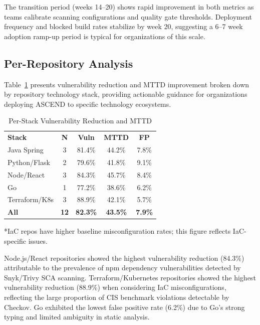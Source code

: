 \documentclass[journal]{IEEEtran}
\begin{document}
The transition period (weeks 14--20) shows rapid improvement in both metrics as teams calibrate scanning configurations and quality gate thresholds. Deployment frequency and blocked build rates stabilize by week 20, suggesting a 6--7 week adoption ramp-up period is typical for organizations of this scale.

\subsection{Per-Repository Analysis}

Table~\ref{tab:perrepo} presents vulnerability reduction and MTTD improvement broken down by repository technology stack, providing actionable guidance for organizations deploying ASCEND to specific technology ecosystems.

\begin{table}[h]
\centering
\caption{Per-Stack Vulnerability Reduction and MTTD}
\label{tab:perrepo}
\scriptsize
\begin{tabular}{@{}lcccc@{}}
\rowcolor{TableHeader}\color{white}\textbf{Stack} & \color{white}\textbf{N} & \color{white}\textbf{Vuln} & \color{white}\textbf{MTTD} & \color{white}\textbf{FP} \\
\rowcolor{TableAlt}Java Spring & 3 & 81.4\% & 44.2\% & 7.8\% \\
\rowcolor{white}Python/Flask & 2 & 79.6\% & 41.8\% & 9.1\% \\
\rowcolor{TableAlt}Node/React & 3 & 84.3\% & 45.7\% & 8.4\% \\
\rowcolor{white}Go & 1 & 77.2\% & 38.6\% & 6.2\% \\
\rowcolor{TableAlt}Terraform/K8s & 3 & 88.9\% & 42.1\% & 5.7\% \\
\rowcolor{IEEENavy!20}\textbf{All} & \textbf{12} & \textbf{82.3\%} & \textbf{43.5\%} & \textbf{7.9\%} \\
\end{tabular}
\end{table}
\footnotesize{*IaC repos have higher baseline misconfiguration rates; this figure reflects IaC-specific issues.}

Node.js/React repositories showed the highest vulnerability reduction (84.3\%) attributable to the prevalence of npm dependency vulnerabilities detected by Snyk/Trivy SCA scanning. Terraform/Kubernetes repositories showed the highest vulnerability reduction (88.9\%) when considering IaC misconfigurations, reflecting the large proportion of CIS benchmark violations detectable by Checkov. Go exhibited the lowest false positive rate (6.2\%) due to Go's strong typing and limited ambiguity in static analysis.
\end{document}
